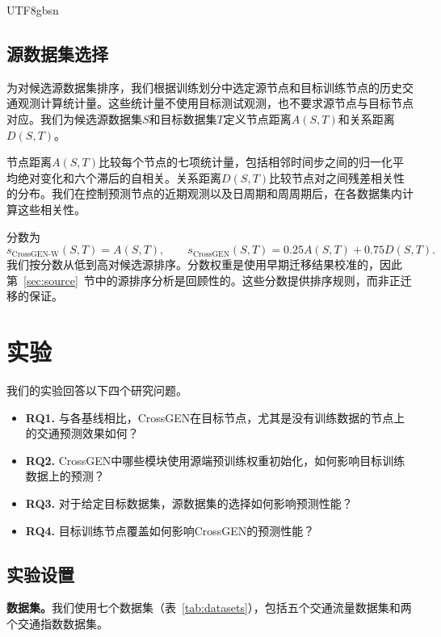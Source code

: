 \documentclass[runningheads,a4paper]{llncs}
\begin{document}
\begin{CJK*}{UTF8}{gbsn}
\subsection{源数据集选择}
\label{sec:source-selection}

为对候选源数据集排序，我们根据训练划分中选定源节点和目标训练节点的历史交通观测计算统计量。这些统计量不使用目标测试观测，也不要求源节点与目标节点对应。我们为候选源数据集$S$和目标数据集$T$定义节点距离$A(S,T)$和关系距离$D(S,T)$。

节点距离$A(S,T)$比较每个节点的七项统计量，包括相邻时间步之间的归一化平均绝对变化和六个滞后的自相关。关系距离$D(S,T)$比较节点对之间残差相关性的分布。我们在控制预测节点的近期观测以及日周期和周周期后，在各数据集内计算这些相关性。

分数为
\[
s_{\text{CrossGEN-W}}(S,T)=A(S,T),\qquad
s_{\text{CrossGEN}}(S,T)=0.25A(S,T)+0.75D(S,T).
\]
我们按分数从低到高对候选源排序。分数权重是使用早期迁移结果校准的，因此第~\ref{sec:source}~节中的源排序分析是回顾性的。这些分数提供排序规则，而非正迁移的保证。

\section{实验}\label{sec:results}
\begin{samepage}
我们的实验回答以下四个研究问题。
\begingroup
\DeclareRobustCommand{\revisedresearchquestions}{%
  \begin{itemize}
  \item \textbf{RQ1.} 与各基线相比，CrossGEN在目标节点，尤其是没有训练数据的节点上的交通预测效果如何？
  \item \textbf{RQ2.} CrossGEN中哪些模块使用源端预训练权重初始化，如何影响目标训练数据上的预测？
  \item \textbf{RQ3.} 对于给定目标数据集，源数据集的选择如何影响预测性能？
  \item \textbf{RQ4.} 目标训练节点覆盖如何影响CrossGEN的预测性能？
  \end{itemize}%
}
\revisedresearchquestions
\endgroup
\end{samepage}

\subsection{实验设置}
\label{sec:experimental-settings}


\noindent\textbf{数据集。}我们使用七个数据集（表~\ref{tab:datasets}），包括五个交通流量数据集和两个交通指数数据集。


\end{CJK*}
\end{document}
